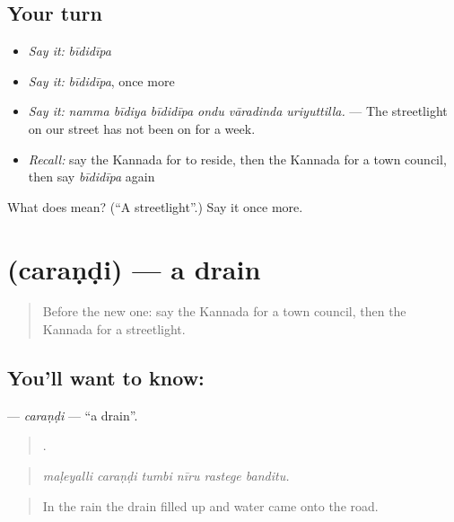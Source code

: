 \subsection*{Your turn}
\begin{itemize}
\raggedright
  \item \emph{Say it:} \emph{bīdidīpa}
  \item \emph{Say it:} \emph{bīdidīpa}, once more
  \item \emph{Say it:} \emph{namma bīdiya bīdidīpa ondu vāradinda uriyuttilla.} — The streetlight on our street has not been on for a week.
  \item \emph{Recall:} say the Kannada for to reside, then the Kannada for a town council, then say \emph{bīdidīpa} again
\end{itemize}

\begin{tcolorbox}[breakable,colback=teal!4,colframe=teal!35!black,title={Before you move on}]
What does  mean? (\textquotedblleft{}A streetlight\textquotedblright{}.) Say it once more.
\end{tcolorbox}
\section[\texorpdfstring{\kn{ಚರಂಡಿ} (caraṇḍi)}{ಚರಂಡಿ (caraṇḍi)}]{ (caraṇḍi) — a drain}

\label{lesson:KA-C466-carandi}



\begin{quote}
Before the new one: say the Kannada for a town council, then the Kannada for a streetlight.
\end{quote}

\subsection*{You'll want to know: }
\textbf{} — \emph{caraṇḍi} — \textquotedblleft{}a drain\textquotedblright{}.

\begin{quote}
     .
\end{quote}

\begin{quote}
\emph{maḷeyalli caraṇḍi tumbi nīru rastege banditu.}
\end{quote}

\begin{quote}
In the rain the drain filled up and water came onto the road.
\end{quote}

